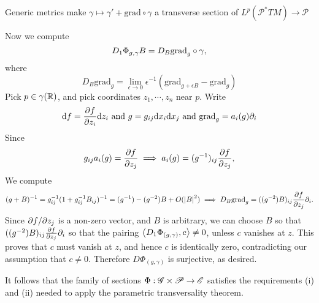 \documentclass{amsart}
\begin{document}
\begin{clear}{Generic metrics make $\gamma\mapsto
    \gamma'+\text{grad}\circ \gamma$ a transverse section of
    $L^{p}(\mathscr{P}^{*}TM)\to \mathscr{P}$}
\begin{example}
    Now we compute
    \begin{equation*}
      D_{1}\Phi_{g,\gamma}B=D_{B}\mathrm{grad}_{g}\circ \gamma,
    \end{equation*}
    where
    \begin{equation*}
      D_{B}\text{grad}_{g}=\lim_{\epsilon\to 0}\epsilon^{-1}(\text{grad}_{g+\epsilon B}-\text{grad}_{g})
    \end{equation*}
    Pick $p\in \gamma(\mathbb{R})$, and pick coordinates $z_{1},\cdots,z_{n}$
    near $p$. Write
    \begin{equation*}
      \mathrm{d} f=\frac{\partial f}{\partial z_{i}}\mathrm{d} z_{i}\text{ and }g=g_{ij}\mathrm{d} x_{i}\mathrm{d}
      x_{j}\text{ and }\mathrm{grad}_{g}=a_{i}(g)\partial_{i}
    \end{equation*}
    Since
    \begin{equation*}
      g_{ij}a_{i}(g)=\frac{\partial f}{\partial z_{j}}\implies a_{i}(g)=(g^{-1})_{ij}\frac{\partial f}{\partial z_{j}},
    \end{equation*}
    We compute
    \begin{equation*}
      (g+B)^{-1}=g_{ij}^{-1}(1+g_{ij}^{-1}B_{ij})^{-1}=(g^{-1})-(g^{-2})B+O(\left|B\right|^{2})\implies
      D_{B}\text{grad}_{g}=((g^{-2})B)_{ij}\frac{\partial f}{\partial z_{j}}\partial_{i}.
    \end{equation*}
    Since $\partial f/\partial z_{j}$ is a non-zero vector, and $B$ is
    arbitrary, we can choose $B$ so that
    $((g^{-2})B)_{ij}\frac{\partial f}{\partial z_{j}}\partial_{i}$ so that the pairing
    $\left\langle D_{1}\Phi_{(g,\gamma)},c\right\rangle\ne 0$, unless $c$ vanishes at
    $z$. This proves that $c$ must vanish at $z$, and hence $c$ is
    identically zero, contradicting our assumption that $c\ne
    0$. Therefore $D\Phi_{(g,\gamma)}$ is surjective, as desired.

    It follows that the family of sections $\Phi:\mathscr{G}\times
    \mathscr{P}\to \mathscr{E}$ satisfies the requirements (i) and    (ii) needed to apply the parametric transversality theorem.
  \end{example}
\end{clear}
\end{document}
